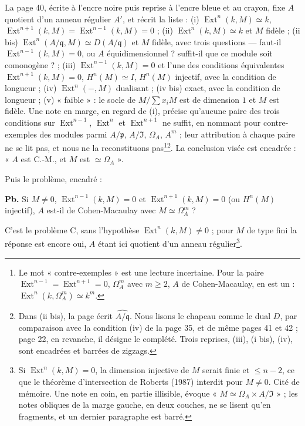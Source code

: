 \documentclass[11pt,a4paper]{article}
\begin{document}
La page 40, écrite à l'encre noire puis reprise à l'encre bleue et au crayon,
fixe $A$ quotient d'un anneau régulier $A'$, et récrit la liste : (i)
$\operatorname{Ext}^n(k, M) \simeq k$, $\operatorname{Ext}^{n+1}(k, M) =
\operatorname{Ext}^{n-1}(k, M) = 0$ ; (ii) $\operatorname{Ext}^n(k, M) \simeq
k$ et $M$ fidèle ; (ii bis) $\operatorname{Ext}^n(A/\mathfrak{q}, M) \simeq
D(A/\mathfrak{q})$ et $M$ fidèle, avec trois questions --- faut-il
$\operatorname{Ext}^{n-1}(k, M) = 0$, ou $A$ équidimensionnel ? suffit-il que
ce module soit comonogène ? ; (iii) $\operatorname{Ext}^{n-1}(k, M) = 0$ et
l'une des conditions équivalentes $\operatorname{Ext}^{n+1}(k, M) = 0$,
$H^n(M) \simeq I$, $H^n(M)$ injectif, avec la condition de longueur ; (iv)
$\operatorname{Ext}^n(-, M)$ dualisant ; (iv bis) exact, avec la condition de
longueur ; (v) « faible » : le socle de $M/\sum x_iM$ est de dimension $1$ et
$M$ est fidèle. Une note en marge, en regard de (i), précise qu'aucune paire
des trois conditions sur $\operatorname{Ext}^{n-1}$, $\operatorname{Ext}^n$ et
$\operatorname{Ext}^{n+1}$ ne suffit, en nommant pour contre-exemples des
modules parmi $A/\mathfrak{p}$, $A/\mathfrak{I}$, $\Omega_A$, $A^m$ ; leur
attribution à chaque paire ne se lit pas, et nous ne la reconstituons
pas\footnote{Le mot « contre-exemples » est une lecture incertaine. Pour la
paire $\operatorname{Ext}^{n-1} = \operatorname{Ext}^{n+1} = 0$, $\Omega_A^m$
avec $m \geqslant 2$, $A$ de Cohen-Macaulay, en est un : $\operatorname{Ext}^n(k,
\Omega_A^m) \simeq k^m$.}\footnote{Dans (ii bis), la page écrit
$\widehat{A/\mathfrak{q}}$. Nous lisons le chapeau comme le dual $D$, par
comparaison avec la condition (iv) de la page 35, et de même pages 41 et 42 ;
page 22, en revanche, il désigne le complété. Trois reprises, (iii), (i bis),
(iv), sont encadrées et barrées de zigzags.}. La conclusion visée est encadrée
: « $A$ est C.-M., et $M$ est $\simeq \Omega_A$ ».

Puis le problème, encadré :

\textbf{Pb.} Si $M \neq 0$, $\operatorname{Ext}^{n-1}(k, M) = 0$ et
$\operatorname{Ext}^{n+1}(k, M) = 0$ (ou $H^n(M)$ injectif), $A$ est-il de
Cohen-Macaulay avec $M \simeq \Omega_A^m$ ?

C'est le problème C, sans l'hypothèse $\operatorname{Ext}^n(k, M) \neq 0$ ;
pour $M$ de type fini la réponse est encore oui, $A$ étant ici quotient d'un
anneau régulier\footnote{Si $\operatorname{Ext}^n(k, M) = 0$, la dimension
injective de $M$ serait finie et $\leqslant n - 2$, ce que le théorème
d'intersection de Roberts (1987) interdit pour $M \neq 0$. Cité de mémoire.
Une note en coin, en partie illisible, évoque « $M \simeq \Omega_A \times
A/\mathfrak{I}$ » ; les notes obliques de la marge gauche, en deux couches, ne
se lisent qu'en fragments, et un dernier paragraphe est barré.}.
\end{document}
